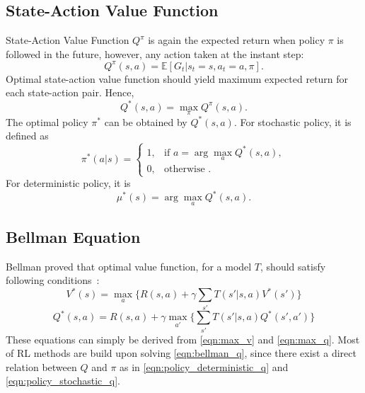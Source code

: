 \subsection{State-Action Value Function}

State-Action Value Function $Q^{\pi}$ is again the expected return when policy $\pi$ is followed in the future, 
however, any action taken at the instant step:
\begin{equation}
Q^{\pi}(s,a) = \mathbb{E}[G_t|s_t=s, a_t=a, \pi]. %
\end{equation}
Optimal state-action value function should yield maximum expected return for each state-action pair. Hence,
\begin{equation}
\label{eqn:max_q}
Q^{*}(s,a) = \max_{\pi} Q^{\pi}(s,a).
\end{equation}
The optimal policy $\pi^*$ can be obtained by $Q^{*}(s,a)$. For stochastic policy, it is defined as  
\begin{equation}
\label{eqn:policy_stochastic_q}
\pi^{*}(a|s) = 
\begin{cases}
1,   & \text{if  } a = \arg\max_{a} Q^{*}(s,a), \\
0,   & \text{otherwise  }.
\end{cases} 
\end{equation}
For deterministic policy, it is
\begin{equation}
\label{eqn:policy_deterministic_q}
\mu^{*}(s) = \arg\max_{a} Q^{*}(s,a).
\end{equation}

\subsection{Bellman Equation}

Bellman proved that optimal value function, for a model $T$, should satisfy following conditions~\cite{bellman_dynamic_2003}: 
\begin{equation}
\label{eqn:bellman_v}
V^{*}(s) = \max_{a} \Big\{ R(s,a) + \gamma \sum_{s'} T(s'|s,a) V^{*}(s') \Big\}
\end{equation}
\begin{equation}
\label{eqn:bellman_q}
Q^{*}(s,a) = R(s,a) + \gamma \max_{a'} \Big\{ \sum_{s'} T(s'|s,a) Q^{*}(s',a') \Big\}
\end{equation}
These equations can simply be derived from \eqref{eqn:max_v} and \eqref{eqn:max_q}. 
Most of RL methods are build upon solving \eqref{eqn:bellman_q}, since there exist a direct relation between $Q$ and $\pi$ as in \eqref{eqn:policy_deterministic_q} and \eqref{eqn:policy_stochastic_q}.
